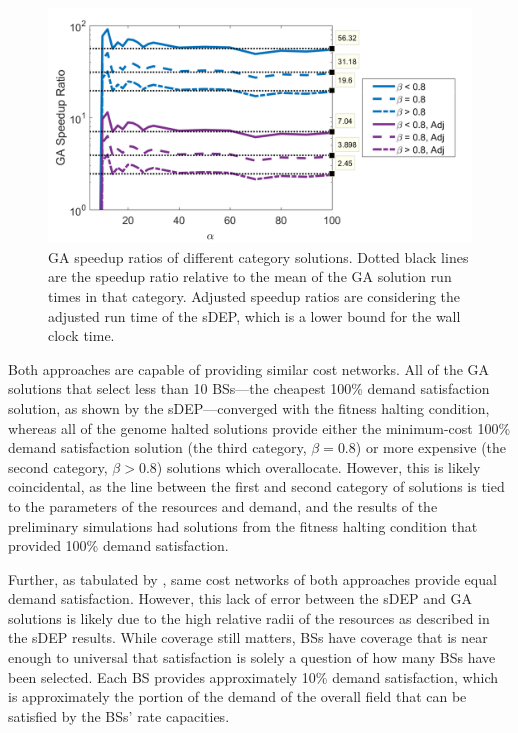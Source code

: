 \documentclass[12pt,dvipsnames]{report}
\begin{document}
\begin{figure}[ht]
	\centering
	\includegraphics[height=0.4\textheight]{Figures/CaseI_GASpeedupRatios2}
	\caption[Case I GA speedup ratios]{GA speedup ratios of different category solutions.  Dotted black lines are the speedup ratio relative to the mean of the GA solution run times in that category.  Adjusted speedup ratios are considering the adjusted run time of the sDEP, which is a lower bound for the wall clock time.}
	\label{fig:CaseI_GASpeedup}
\end{figure}

Both approaches are capable of providing similar cost networks.  All of the GA solutions that select less than 10 BSs---the cheapest 100\% demand satisfaction solution, as shown by the sDEP---converged with the fitness halting condition, whereas all of the genome halted solutions provide either the minimum-cost 100\% demand satisfaction solution (the third category, $\beta = 0.8$) or more expensive (the second category, $\beta > 0.8$) solutions which overallocate.  However, this is likely coincidental, as the line between the first and second category of solutions is tied to the parameters of the resources and demand, and the results of the preliminary simulations had solutions from the fitness halting condition that provided 100\% demand satisfaction.

Further, as tabulated by , same cost networks of both approaches provide equal demand satisfaction.  However, this lack of error between the sDEP and GA solutions is likely due to the high relative radii of the resources as described in the sDEP results.  While coverage still matters, BSs have coverage that is near enough to universal that satisfaction is solely a question of how many BSs have been selected.  Each BS provides approximately 10\% demand satisfaction, which is approximately the portion of the demand of the overall field that can be satisfied by the BSs' rate capacities.
\end{document}
